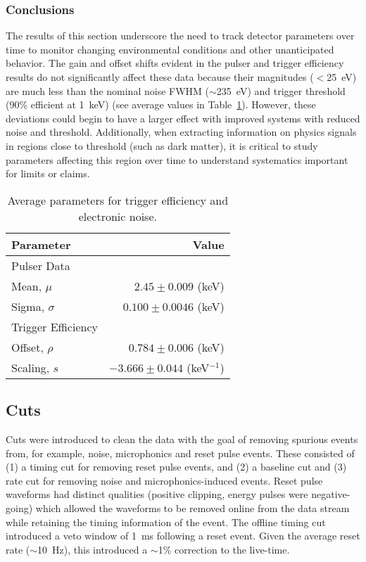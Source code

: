 	    	\subsubsection{Conclusions}
		\label{sec:DeploymentPPC2SoudanAnalysisParsTimeConclusion}    	
	
	The results of this section underscore the need to track detector parameters over time to monitor changing environmental conditions and other unanticipated behavior.  The gain and offset shifts evident in the pulser and trigger efficiency results do not significantly affect these data because their magnitudes ($<$25~eV) are much less than the nominal noise FWHM ($\sim$235~eV) and trigger threshold (90\% efficient at 1~keV) (see average values in Table~\ref{tab:PPC2AvgPars}).  However, these deviations could begin to have a larger effect with improved systems with reduced noise and threshold.  Additionally, when extracting information on physics signals in regions close to threshold (such as dark matter), it is critical to study parameters affecting this region over time to understand systematics important for limits or claims.  
	
				\begin{table}
					\centering
					\begin{tabular}{l|r}
						Parameter & Value \\
						\hline
						    Pulser Data 	  \\
						    Mean, $\mu$ &  $2.45\pm0.009$ (keV) \\
						    Sigma, $\sigma$ &  $0.100\pm0.0046$ (keV) \\						    
						    Trigger Efficiency 	  \\
						    Offset, $\rho$ &  $0.784\pm0.006$ (keV) \\
						    Scaling, $s$ &  $-3.666\pm0.044$ (keV$^{-1}$) \\						    						    
						\hline
					\end{tabular}
					\caption[Average parameters for trigger efficiency and electronic noise]
					{Average parameters for trigger efficiency and electronic noise.}
					\label{tab:PPC2AvgPars}
				\end{table}	
	    	\subsection{Cuts}
		\label{sec:DeploymentPPC2SoudanAnalysisCuts}    
			
	Cuts were introduced to clean the data with the goal of removing spurious events from, for example, noise, microphonics and reset pulse events.  These consisted of (1) a timing cut for removing reset pulse events, and (2) a baseline cut and (3) rate cut for removing noise and microphonics-induced events.  Reset pulse waveforms had distinct qualities (positive clipping, energy pulses were negative-going) which allowed the waveforms to be removed online from the data stream while retaining the timing information of the event.  The offline timing cut introduced a veto window of 1~ms following a reset event.  Given the average reset rate ($\sim$10~Hz), this introduced a $\sim$1\% correction to the live-time.  
	
